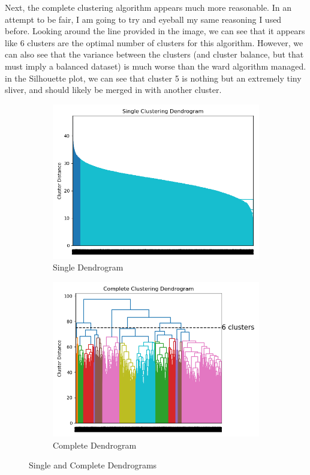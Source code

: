 \documentclass[12pt]{article}
\begin{document}
Next, the complete clustering algorithm appears much more reasonable. In an attempt to be fair, I am going to try and 
eyeball my same reasoning I used before. Looking around the line provided in the image, we can see that it appears like 
6 clusters are the optimal number of clusters for this algorithm. However, we can also see that the variance between
the clusters (and cluster balance, but that must imply a balanced dataset) is much worse than the ward algorithm managed.
in the Silhouette plot, we can see that cluster 5 is nothing but an extremely tiny sliver, and should likely be merged
in with another cluster.
\begin{figure}
    \begin{subfigure}{.5\textwidth}
        \includegraphics[width=.95\textwidth]{../results/agglo/Singledendrogram.png}
        \caption{Single Dendrogram}
        \end{subfigure}%
      \begin{subfigure}{.5\textwidth}
        \includegraphics[width=.95\textwidth]{../results/agglo/Completedendrogram.png}
        \caption{Complete Dendrogram}
      \end{subfigure}
\caption{Single and Complete Dendrograms}
\label{figure6}
\end{figure}
\end{document}
